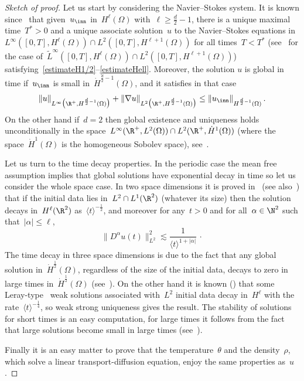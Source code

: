 \begin{proof}[Sketch of proof]
Let us start by considering the Navier--Stokes system. It is known since~\cite{cheminSIAM,fujitakato} that
given~$ u_{\inn} $ in~$ H^\ell(\Omega)$ with~$\ell \geq \frac d2-1$, there is a unique maximal time~$T^*>0$ and a unique associate solution~$u$ to the Navier--Stokes equations in~$ L^\infty([0,T],H^\ell(\Omega)) \cap L^2([0,T],H^{\ell+1}(\Omega))$ for all times~$T<T^*$ (see~\cite{cheminlerner} for the case of~$\tilde L^\infty([0,T],H^\ell(\Omega)) \cap L^2([0,T],H^{\ell+1}(\Omega))$) satisfying~\eqref{estimateH1/2}--\eqref{estimateHell}. Moreover, the solution $u$ is global in time if~$u_{\inn}$ is small in~$ \dot H^{\frac d2-1}(\Omega)$, and it satisfies in that case
\[
\|u\|_{L^\infty \big(\R^+, H^{\frac d2-1}(\Omega) \big)} + \|\nabla u\|_{L^2 \big(\R^+, H^{\frac d2-1}(\Omega) \big) } \leq \|u_{\inn}\|_{H^{\frac d2-1}(\Omega)} \,.
\]
On the other hand if~$d=2$ then global existence and uniqueness holds unconditionally in the space~$ L^\infty(\R^+,L^2(\Omega)) \cap L^2(\R^+,\dot H^{1}(\Omega))$ (where the space~$\dot H^{1}(\Omega)$ is the homogeneous Sobolev space), see~\cite{leray2D}.

Let us turn to the time decay properties. In the periodic case the mean free assumption implies that global solutions have exponential decay in time so let us consider the whole space case. In two space dimensions it is proved in~\cite{wiegner} (see also~\cite{Schonbek24}) that if the initial data lies in~$L^2\cap L^1(\R^2)$ (whatever its size) then the solution decays in~$H^\ell(\R^2)$ as~$\langle t \rangle^{-\frac12}$, and moreover for any~$t >0$ and for all~$ \alpha \in \N^2 $ such that~$ |\alpha| \le \ell$,
\[
\|D^\alpha u(t)\|^2_{L^2} \lesssim \frac{1}{\langle t \rangle^{1+|\alpha|}} \, \cdotp
\]
The time decay in three space dimensions is due to the fact that any global solution in~$\dot H^{\frac 12}(\Omega)$, regardless of the size of the initial data, decays to zero in large times in~$\dot H^\frac 12 (\Omega)$ (see~\cite{GIP}). On the other hand it is known (\cite{Schonbek}) that some Leray-type~\cite{leray} weak solutions associated with~$L^2$ initial data decay in~$H^\ell$ with the rate~$\langle t\rangle^{-\frac14}$, so weak strong uniqueness gives the result. The stability of solutions for short times is an easy computation, for large times it follows from the fact that large solutions become small in large times (see~\cite{GIP,wiegner}).


Finally it is an easy matter to prove that the temperature~$\theta$ and the density~$\rho$, which solve a linear transport-diffusion equation, enjoy the same properties as~$u$.
\end{proof}%


